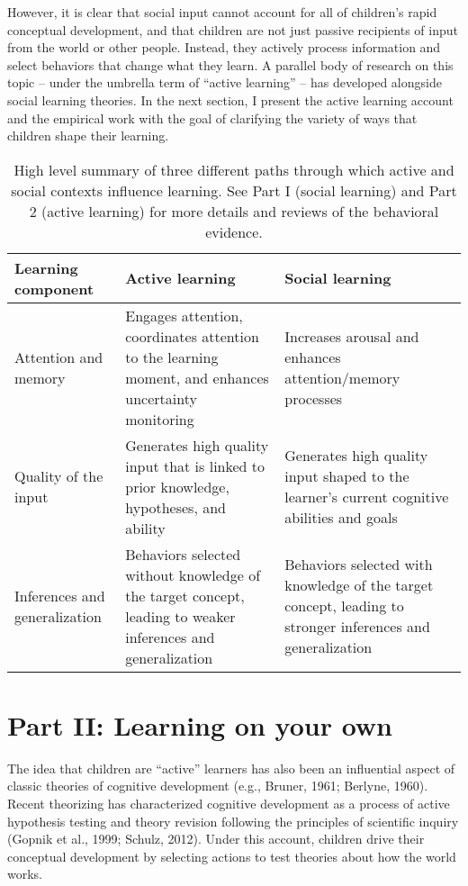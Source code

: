 \documentclass[oneside]{report}
\begin{document}
However, it is clear that social input cannot account for all of
children's rapid conceptual development, and that children are not just
passive recipients of input from the world or other people. Instead,
they actively process information and select behaviors that change what
they learn. A parallel body of research on this topic -- under the
umbrella term of ``active learning'' -- has developed alongside social
learning theories. In the next section, I present the active learning
account and the empirical work with the goal of clarifying the variety
of ways that children shape their learning.
\begin{table}[tb]
\centering
\caption{High level summary of three different paths through which active and social contexts influence learning. See Part I (social learning) and Part 2 (active learning) for more details and reviews of the behavioral evidence.} 
\label{act_soc}
\begin{tabular}{p{1.5in}|p{2in}|p{2in}}
 {\textbf{Learning component}} & {\textbf{Active learning}} & {\textbf{Social learning}} \\ 
  \hline
Attention and memory & Engages attention, coordinates attention to the learning moment, and enhances uncertainty monitoring & Increases arousal and enhances attention/memory processes \\ 
   \hline
Quality of the input & Generates high quality input that is linked to prior knowledge,  hypotheses, and ability & Generates high quality input shaped to the learner's current cognitive abilities and goals \\ 
   \hline
Inferences and generalization & Behaviors selected without knowledge of the target concept, leading to weaker inferences and generalization & Behaviors selected with knowledge of the target concept, leading to stronger inferences and generalization \\ 
   \hline
\end{tabular}
\end{table}
\hypertarget{p2}{%
\section{Part II: Learning on your own}\label{p2}}

The idea that children are ``active'' learners has also been an
influential aspect of classic theories of cognitive development (e.g.,
Bruner, 1961; Berlyne, 1960). Recent theorizing has characterized
cognitive development as a process of active hypothesis testing and
theory revision following the principles of scientific inquiry (Gopnik
et al., 1999; Schulz, 2012). Under this account, children drive their
conceptual development by selecting actions to test theories about how
the world works.
\end{document}
